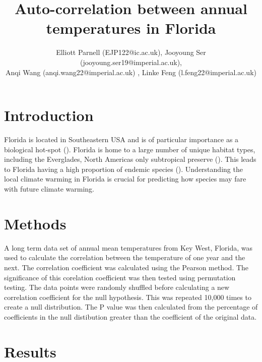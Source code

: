 \documentclass{article}
\title{\textbf{Auto-correlation between annual temperatures in Florida\vspace{-0.5em}}}
\author{Elliott Parnell (EJP122@ic.ac.uk), Jooyoung Ser (jooyoung.ser19@imperial.ac.uk), \\ Anqi Wang (anqi.wang22@imperial.ac.uk) , Linke Feng (l.feng22@imperial.ac.uk) }
\begin{document}
\maketitle
    \section{Introduction \vspace{-0.5em}}
    Florida is located in Southeastern USA and is of particular importance as a biological hot-spot (\cite{noss2015global}). Florida is home to a large number of unique habitat types, including the Everglades, North Americas only subtropical preserve (\cite{brown2006species}). This leads to Florida having a high proportion of endemic species (\cite{jenkins2015us}). Understanding the local climate warming in Florida is crucial for predicting how species may fare with future climate warming. 
\vspace{-0.9em}
    \section{Methods \vspace{-0.5em}}

    A long term data set of annual mean temperatures from Key West, Florida, was used to calculate the correlation between the temperature of one year and the next. The correlation coefficient was calculated using the Pearson method. The significance of this corelation coefficient was then tested using permutation testing. The data points were randomly shuffled before calculating a new correlation coefficient for the null hypothesis. This was repeated 10,000 times to create a null distribution. The P value was then calculated from the percentage of coefficients in the null distibution greater than the coefficient of the original data. 
\vspace{-0.9em}
    \section{Results \vspace{-0.5em}}
    
\end{document}
